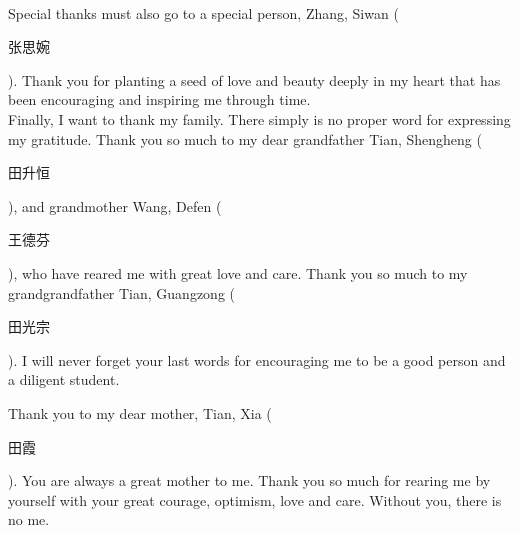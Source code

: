 \\
Special thanks must also go to a special person, Zhang, Siwan (\begin{CJK}{UTF8}{gbsn}张思婉\end{CJK}). Thank you for planting a seed of love and beauty deeply in my heart that has been encouraging and inspiring me through time.    
\\
Finally, I want to thank my family. There simply is no proper word for expressing my gratitude. Thank you so much to my dear grandfather Tian, Shengheng (\begin{CJK}{UTF8}{gbsn}田升恒\end{CJK}), and grandmother Wang, Defen (\begin{CJK}{UTF8}{gbsn}王德芬\end{CJK}), who have reared me with great love and care. Thank you so much to my grandgrandfather Tian, Guangzong (\begin{CJK}{UTF8}{gbsn}田光宗\end{CJK}). I will never forget your last words for encouraging me to be a good person and a diligent student.

Thank you to my dear mother, Tian, Xia (\begin{CJK}{UTF8}{gbsn}田霞\end{CJK}). You are always a great mother to me. Thank you so much for rearing me by yourself with your great courage, optimism, love and care. Without you, there is no me.
